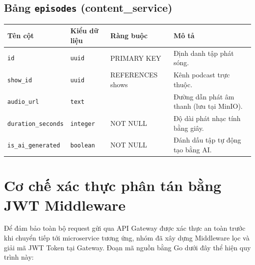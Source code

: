 \documentclass[12pt,a4paper]{report}
\begin{document}
\subsection{Bảng \texttt{episodes} (content\_service)}
\begin{table}[h!]
\centering
\begin{tabular}{llp{2.5cm}p{6.5cm}}
\toprule
\textbf{Tên cột} & \textbf{Kiểu dữ liệu} & \textbf{Ràng buộc} & \textbf{Mô tả} \\
\midrule
\texttt{id} & \texttt{uuid} & PRIMARY KEY & Định danh tập phát sóng. \\
\texttt{show\_id} & \texttt{uuid} & REFERENCES shows & Kênh podcast trực thuộc. \\
\texttt{audio\_url} & \texttt{text} & & Đường dẫn phát âm thanh (lưu tại MinIO). \\
\texttt{duration\_seconds} & \texttt{integer} & NOT NULL & Độ dài phát nhạc tính bằng giây. \\
\texttt{is\_ai\_generated} & \texttt{boolean} & NOT NULL & Đánh dấu tập tự động tạo bằng AI. \\
\bottomrule
\end{tabular}
\end{table}

\section{Cơ chế xác thực phân tán bằng JWT Middleware}
Để đảm bảo toàn bộ request gửi qua API Gateway được xác thực an toàn trước khi chuyển tiếp tới microservice tương ứng, nhóm đã xây dựng Middleware lọc và giải mã JWT Token tại Gateway. Đoạn mã nguồn bằng Go dưới đây thể hiện quy trình này:
\end{document}
